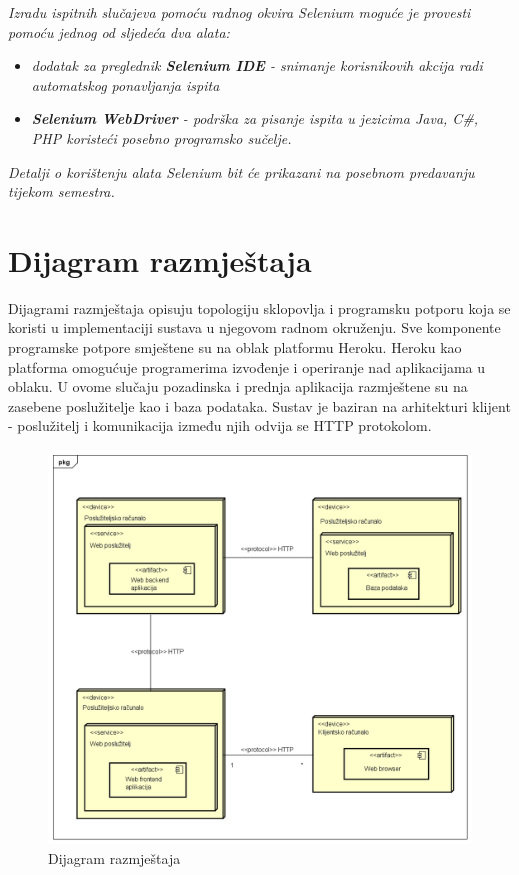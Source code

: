 			 \textit{Izradu ispitnih slučajeva pomoću radnog okvira Selenium moguće je provesti pomoću jednog od sljedeća dva alata:}
			 \begin{itemize}
			 	\item \textit{dodatak za preglednik \textbf{Selenium IDE} - snimanje korisnikovih akcija radi automatskog ponavljanja ispita	}
			 	\item \textit{\textbf{Selenium WebDriver} - podrška za pisanje ispita u jezicima Java, C\#, PHP koristeći posebno programsko sučelje.}
			 \end{itemize}
		 	\textit{Detalji o korištenju alata Selenium bit će prikazani na posebnom predavanju tijekom semestra.}
			
			\eject 
		
		
		\section{Dijagram razmještaja}
			 
			 Dijagrami razmještaja opisuju topologiju sklopovlja i programsku potporu koja se koristi u implementaciji sustava u njegovom radnom okruženju. Sve komponente programske potpore smještene su na oblak platformu Heroku. Heroku kao platforma omogućuje programerima izvođenje i operiranje nad aplikacijama u oblaku. U ovome slučaju pozadinska i prednja aplikacija razmještene su na zasebene poslužitelje kao i baza podataka. Sustav je baziran na arhitekturi klijent - poslužitelj i komunikacija između njih odvija se HTTP protokolom. 
			 
			 	\begin{figure}[H]
			 	\begin{center}
			 		\includegraphics[width=15cm]{slike/deploy_fin.PNG}
			 	\end{center}
			 	\caption{Dijagram razmještaja}
			 	\label{fig:deploy_pic}
			 \end{figure}
			
